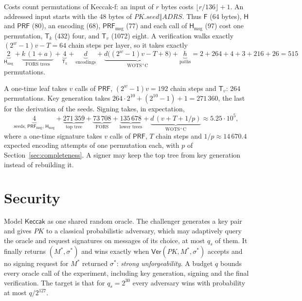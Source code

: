 \documentclass[11pt]{article}
\newcommand{\keccak}{\mathsf{Keccak}}
\newcommand{\PRF}{\mathsf{PRF}}
\newcommand{\PRFmsg}{\mathsf{PRF}_{\mathrm{msg}}}
\newcommand{\Hmsg}{\mathsf{H}_{\mathrm{msg}}}
\newcommand{\Ver}{\mathsf{Ver}}
\newcommand{\concat}{\mathbin\Vert}
\newcommand{\PK}{\mathit{PK}}
\newcommand{\pkseed}{\mathit{PK.seed}}
\newcommand{\addr}{\mathit{ADRS}}
\begin{document}
Costs count permutations of Keccak-f: an input of $r$ bytes costs $\lfloor r/136\rfloor+1$. An addressed input starts with the 48 bytes of $\pkseed\concat\addr$. Thus $\mathsf F$ (64 bytes), $\mathsf H$ and $\PRF$ (80), an encoding (68), $\PRFmsg$ (77) and each call of $\Hmsg$ (97) cost one permutation, $\mathsf T_k$ (432) four, and $\mathsf T_v$ (1072) eight. A verification walks exactly $(2^w-1)v-T=64$ chain steps per layer, so it takes exactly
\[
  \underbrace{2}_{\Hmsg}
  +\underbrace{k\,(1+a)}_{\text{FORS trees}}
  +\underbrace{4}_{\mathsf T_k}
  +\underbrace{d}_{\text{encodings}}
  +\underbrace{d\bigl((2^w-1)v-T+8\bigr)}_{\text{WOTS$^+$C}}
  +\underbrace{h}_{\text{paths}}
  =2+264+4+3+216+26=515
\]
permutations.

A one-time leaf takes $v$ calls of $\PRF$, $(2^w-1)v=192$ chain steps and $\mathsf T_v$: 264 permutations. Key generation takes $264\cdot2^{10}+(2^{10}-1)+1=271\,360$, the last for the derivation of the seeds. Signing takes, in expectation,
\[
  \underbrace{4}_{\text{seeds, }\PRFmsg,\,\Hmsg}
  +\underbrace{271\,359}_{\text{top tree}}
  +\underbrace{73\,708}_{\text{FORS}}
  +\underbrace{135\,678}_{\text{lower trees}}
  +\underbrace{d\,(v+T+1/p)}_{\text{WOTS$^+$C}}
  \approx5.25\cdot10^5,
\]
where a one-time signature takes $v$ calls of $\PRF$, $T$ chain steps and $1/p\approx14\,670.4$ expected encoding attempts of one permutation each, with $p$ of Section~\ref{sec:completeness}. A signer may keep the top tree from key generation instead of rebuilding it.

\section{Security}
\label{sec:security}

Model $\keccak$ as one shared random oracle. The challenger generates a key pair and gives $\PK$ to a classical probabilistic adversary, which may adaptively query the oracle and request signatures on messages of its choice, at most $q_s$ of them. It finally returns $(M^*,\sigma^*)$ and wins exactly when $\Ver(\PK,M^*,\sigma^*)$ accepts and no signing request for $M^*$ returned $\sigma^*$: \emph{strong unforgeability}. A budget $q$ bounds every oracle call of the experiment, including key generation, signing and the final verification. The target is that for $q_s=2^{30}$ every adversary wins with probability at most $q/2^{127}$.
\end{document}
